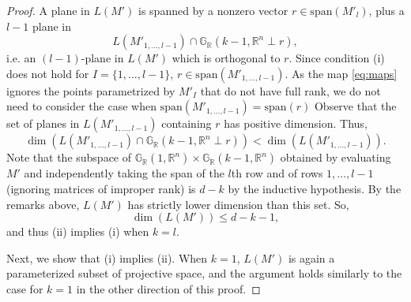 \documentclass[11pt]{article}
\newcommand{\R}{\mathbb{R}}
\newcommand{\Grall}{\mathbb{G}_{\R}}
\renewcommand\vec[1]{\overrightarrow{#1}}
\theoremstyle{remark}
\theoremstyle{definition}
\begin{document}
\begin{appendices}
\begin{proof}
A plane in $L(M')$ is spanned by a nonzero vector $r \in  \mathrm{span}(M'_{l})$, plus a $l-1$ plane in
\begin{displaymath}
L(M'_{1,\dots,l-1}) \cap \Grall(k-1, \mathbb{R}^n \perp r),
\end{displaymath}
i.e.  an $(l-1)$-plane in $L(M')$ which is orthogonal to $r$.
Since condition (i) does not hold for $I = \{1,\dots,l-1\}$, $r \in \mathrm{span}(M'_{1, \dots, l-1})$. As the map \eqref{eq:maps} ignores the points parametrized by $M'_I$ that do not have full rank, we do not need to consider the case when $\mathrm{span}(M'_{1,\dots,l-1}) = \mathrm{span}(r)$ Observe that  the set of planes in $L(M'_{1,\dots,l-1})$ containing $r$ has positive dimension.
Thus,
% 
\begin{displaymath}
\dim(L(M'_{1,\dots,l-1}) \cap \Grall(k-1, \mathbb{R}^n \perp r)) < \dim(L(M'_{1,\dots,l-1})). 
\end{displaymath}
%
\noindent
Note that the subspace of $\Grall(1,\mathbb{R}^n) \times \Grall(k-1, \mathbb{R}^n)$ obtained by evaluating $M'$ and independently taking the span of the $l$th row and of rows $1, \dots, l-1$ (ignoring matrices of improper rank) is $d-k$ by the inductive hypothesis. By the remarks above, $L(M')$ has strictly lower dimension than this set. So,
%
\begin{displaymath}
\dim(L(M')) \leq  d -k - 1,
\end{displaymath}
%
\noindent
and thus (ii) implies (i) when $k = l$.

Next, we show that (i) implies (ii). When $k = 1$, $L(M')$ is again a parameterized subset of projective space, and the argument holds similarly to the case for $k=1$ in the other direction of this proof. 


\end{proof}
\end{appendices}
\end{document}
